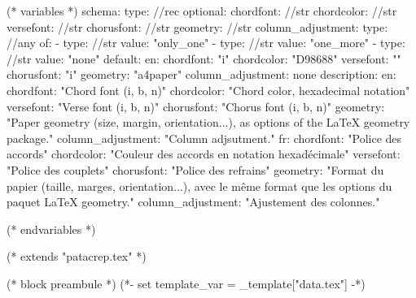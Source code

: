 %
%
%

(* variables *)
schema:
  type: //rec
  optional:
    chordfont: //str
    chordcolor: //str
    versefont: //str
    chorusfont: //str
    geometry: //str
    column_adjustment:
      type: //any
      of:
        - type: //str
          value: "only_one"
        - type: //str
          value: "one_more"
        - type: //str
          value: "none"
default:
  en:
    chordfont: "i"
    chordcolor: "D98688"
    versefont: ""
    chorusfont: "i"
    geometry: "a4paper"
    column_adjustment: none
description:
  en:
    chordfont: "Chord font (i, b, n)"
    chordcolor: "Chord color, hexadecimal notation"
    versefont: "Verse font (i, b, n)"
    chorusfont: "Chorus font (i, b, n)"
    geometry: "Paper geometry (size, margin, orientation...), as options of the LaTeX geometry package."
    column_adjustment: "Column adjsutment."
  fr:
    chordfont: "Police des accords"
    chordcolor: "Couleur des accords en notation hexadécimale"
    versefont: "Police des couplets"
    chorusfont: "Police des refrains"
    geometry: "Format du papier (taille, marges, orientation...), avec le même format que les options du paquet LaTeX geometry."
    column_adjustment: "Ajustement des colonnes."


(* endvariables *)

(* extends "patacrep.tex" *)

(* block preambule *)
(*- set template_var = _template["data.tex"] -*)
\usepackage{licence}

\makeatletter
\renewcommand{\chorusfont}{%
   (* for letter in template_var.chorusfont *)
   (* if letter=="i" *)   \it %
   (* elif letter=='b' *)   \bf %
   (* elif letter=='n' *)   \normalfont %
   (* endif *)
   (* endfor *)
}

